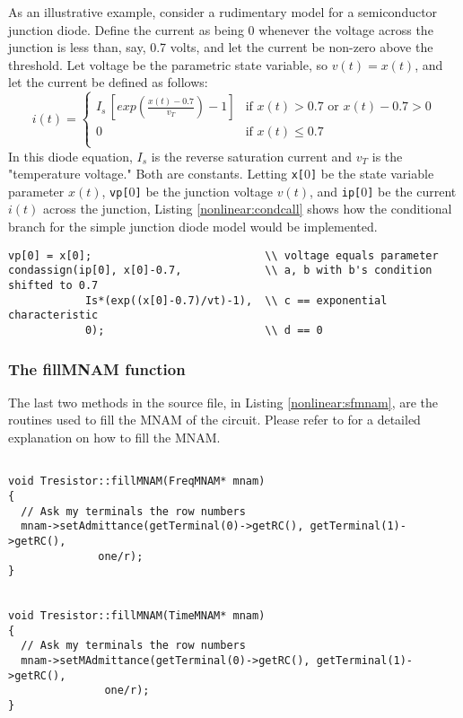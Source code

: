 As an illustrative example, consider a rudimentary model
for a semiconductor junction diode.  Define the current
as being 0 whenever the voltage across the junction is
less than, say, 0.7 volts, and let the current be
non-zero above the threshold.  Let voltage be
the parametric state variable, so $v(t)=x(t)$, and
let the current be defined as follows:
\newline
\begin{displaymath}
i(t) = \left\{ \begin{array}{ll}
    I_s\,[exp(\frac{x(t)-0.7}{v_T})-1] & \textrm{if $x(t) > 0.7$ or $x(t) - 0.7 > 0$}\\
    0 & \textrm{if $x(t) \le 0.7$}\\
    \end{array} \right.
\end{displaymath}
\newline
In this diode equation, $I_s$ is the reverse saturation
current and $v_T$ is the "temperature voltage."  Both
are constants.  Letting \texttt{x[$0$]} be the state
variable parameter $x(t)$, \texttt{vp[$0$]} be the junction
voltage $v(t)$, and \texttt{ip[$0$]} be the current $i(t)$
across the junction, Listing \ref{nonlinear:condcall}
shows how the conditional branch for the simple
junction diode model would be implemented.
\begin{lstlisting}[firstnumber=1, label={nonlinear:condcall},
    caption={Example of branch for simple junction diode.}]
vp[0] = x[0];                           \\ voltage equals parameter
condassign(ip[0], x[0]-0.7,             \\ a, b with b's condition shifted to 0.7
            Is*(exp((x[0]-0.7)/vt)-1),  \\ c == exponential characteristic
            0);                         \\ d == 0
\end{lstlisting}
\subsubsection{The fillMNAM function}
The last two methods in the source file, in Listing
\ref{nonlinear:sfmnam}, are the routines used to
fill the MNAM of the circuit. Please refer to \cite{l_element} for
a detailed explanation on how to fill the MNAM.

\begin{lstlisting}[firstnumber=144, label={nonlinear:sfmnam},
    caption={fillMNAM function of Tresistor.cc}]

void Tresistor::fillMNAM(FreqMNAM* mnam)
{
  // Ask my terminals the row numbers
  mnam->setAdmittance(getTerminal(0)->getRC(), getTerminal(1)->getRC(),
              one/r);
}


void Tresistor::fillMNAM(TimeMNAM* mnam)
{
  // Ask my terminals the row numbers
  mnam->setMAdmittance(getTerminal(0)->getRC(), getTerminal(1)->getRC(),
               one/r);
}
\end{lstlisting}

